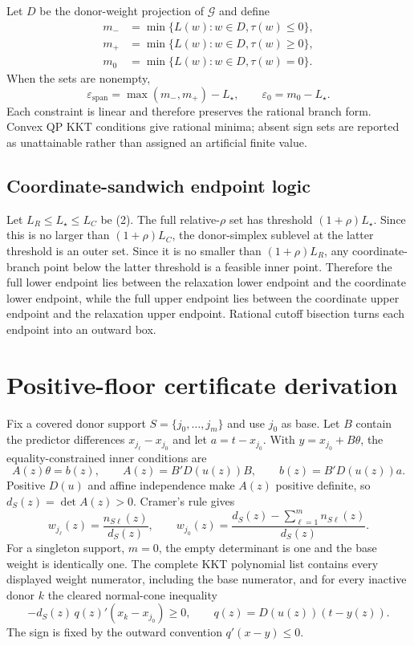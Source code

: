 \documentclass[10pt]{article}
\theoremstyle{definition}
\newcommand{\cG}{\mathcal G}
\newcommand{\eps}{\varepsilon}
\begin{document}
Let $D$ be the donor-weight projection of $\cG$ and define
\begin{align*}
 m_-&=\min\{L(w):w\in D,\tau(w)\le0\},\\
 m_+&=\min\{L(w):w\in D,\tau(w)\ge0\},\\
 m_0&=\min\{L(w):w\in D,\tau(w)=0\}.
\end{align*}
When the sets are nonempty,
\[
 \eps_{\mathrm{span}}=\max(m_-,m_+)-L_\star,\qquad
 \eps_0=m_0-L_\star.
\]
Each constraint is linear and therefore preserves the rational branch form.
Convex QP KKT conditions give rational minima; absent sign sets are reported as
unattainable rather than assigned an artificial finite value.

\subsection{Coordinate-sandwich endpoint logic}

Let $L_R\le L_\star\le L_C$ be (2).  The full relative-$\rho$ set has
threshold $(1+\rho)L_\star$.  Since this is no larger than
$(1+\rho)L_C$, the donor-simplex sublevel at the latter threshold is an outer
set.  Since it is no smaller than $(1+\rho)L_R$, any coordinate-branch point
below the latter threshold is a feasible inner point.  Therefore the full
lower endpoint lies between the relaxation lower endpoint and the coordinate
lower endpoint, while the full upper endpoint lies between the coordinate
upper endpoint and the relaxation upper endpoint.  Rational cutoff bisection
turns each endpoint into an outward box.

\section{Positive-floor certificate derivation}\label{app:floor-proof}

Fix a covered donor support $S=\{j_0,\ldots,j_m\}$ and use $j_0$ as base.
Let $B$ contain the predictor differences $x_{j_\ell}-x_{j_0}$ and let
$a=t-x_{j_0}$.  With $y=x_{j_0}+B\theta$, the equality-constrained inner
conditions are
\[
 A(z)\theta=b(z),\qquad
 A(z)=B'D(u(z))B,\qquad b(z)=B'D(u(z))a.
\]
Positive $D(u)$ and affine independence make $A(z)$ positive definite, so
$d_S(z)=\det A(z)>0$.  Cramer's rule gives
\[
 w_{j_\ell}(z)=\frac{n_{S\ell}(z)}{d_S(z)},\qquad
 w_{j_0}(z)=\frac{d_S(z)-\sum_{\ell=1}^m n_{S\ell}(z)}{d_S(z)}.
\]
For a singleton support, $m=0$, the empty determinant is one and the base
weight is identically one.
The complete KKT polynomial list contains every displayed weight numerator,
including the base numerator, and for every inactive donor $k$ the cleared
normal-cone inequality
\[
 -d_S(z)\,q(z)'(x_k-x_{j_0})\ge0,\qquad
 q(z)=D(u(z))(t-y(z)).
\]
The sign is fixed by the outward convention $q'(x-y)\le0$.
\end{document}
